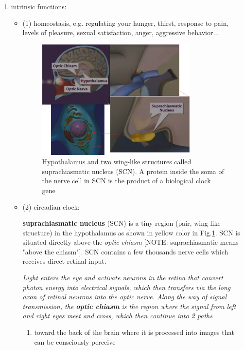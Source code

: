 \begin{enumerate}
  
  \item intrinsic functions: 
  
  \begin{itemize}
    
    \item (1) homeostasis, e.g. regulating your hunger, thirst, response to
    pain, levels of pleasure, sexual satisfaction, anger,
  aggressive behavior...

  \begin{figure}[hbt]
  \centerline{\includegraphics[height=6cm,
    angle=0]{./images/hypothalamus.eps}}
\caption{Hypothalamus and two wing-like structures  called suprachiasmatic
nucleus (SCN). A protein inside the soma of the nerve cell in SCN is the
product of a biological clock gene}
\label{fig:hypothalamus}
\end{figure}
    
    \item (2) circadian clock: 
    
  {\bf suprachiasmatic nucleus} (SCN) is a tiny region (pair, wing-like
  structure) in the hypothalamus as shown in yellow color in
  Fig.\ref{fig:hypothalamus}. SCN is situated directly above the {\it optic
  chiasm} [NOTE: suprachiasmatic means "above the chiasm"]. SCN contains a few
  thousands nerve cells which receives direct retinal input. 

  {\it Light enters the eye and activate neurons in the retina that convert
  photon energy into electrical signals, which then transfers via the long axon
  of retinal neurons into the optic nerve. Along the way of signal transmission,
  the {\bf optic chiasm} is the region where the signal from left and right eyes
  meet and cross, which then continue into 2 paths}
  \begin{enumerate}
    \item toward the back of the   brain where it is processed into images that
    can be consciously perceive	
  

\end{enumerate}
\end{itemize}
\end{enumerate}
